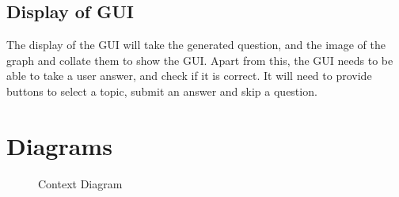 \subsection{Display of GUI}
The display of the GUI will take the generated question, and the image of the graph and collate them to show the GUI. Apart from this, the GUI needs to be able to take a user answer, and check if it is correct. It will need to provide buttons to select a topic, submit an answer and skip a question.
\section{Diagrams}
\begin{figure}[h]
\centering
{}
\caption{Context Diagram}
\end{figure}
